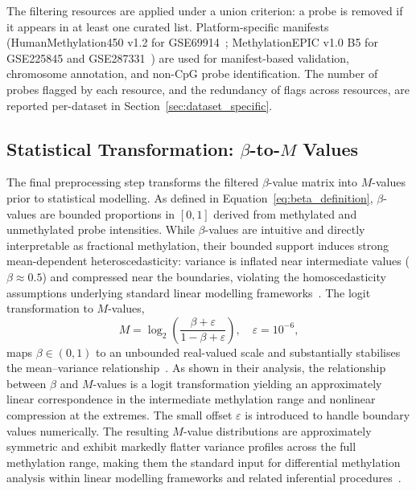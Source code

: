 The filtering resources are applied under a union criterion: a probe is removed if it appears in at least one curated list. Platform-specific 
manifests (HumanMethylation450 v1.2 for GSE69914~\cite{Illumina450kAnno}; 
MethylationEPIC v1.0 B5 for GSE225845 and GSE287331~\cite{IlluminaEPIC}) 
are used for manifest-based validation, chromosome annotation, and 
non-CpG probe identification. The number of probes flagged by each 
resource, and the redundancy of flags across resources, are reported 
per-dataset in Section~\ref{sec:dataset_specific}.

\subsection{Statistical Transformation: $\beta$-to-$M$ Values}
\label{subsec:step3}

The final preprocessing step transforms the filtered $\beta$-value matrix 
into $M$-values prior to statistical modelling. As defined in Equation~\eqref{eq:beta_definition}, $\beta$-values are bounded proportions in $[0,1]$ derived from methylated and unmethylated probe intensities. While $\beta$-values are intuitive and directly 
interpretable as fractional methylation, their bounded support induces 
strong mean-dependent heteroscedasticity: variance is inflated near 
intermediate values ($\beta \approx 0.5$) and compressed near the 
boundaries, violating the homoscedasticity assumptions underlying 
standard linear modelling frameworks~\cite{Du2010}. The logit transformation to $M$-values,
\begin{equation}
    M = \log_2\!\left(\frac{\beta + \varepsilon}{1 - \beta + \varepsilon}\right),
    \quad \varepsilon = 10^{-6},
    \label{eq:mvalue}
\end{equation}
maps $\beta \in (0,1)$ to an unbounded real-valued scale and 
substantially stabilises the mean--variance relationship~\cite{Du2010}. 
As shown in their analysis, the relationship between $\beta$ and $M$-values 
is a logit transformation yielding an approximately linear correspondence 
in the intermediate methylation range and nonlinear compression at the 
extremes. The small offset $\varepsilon$ is introduced to handle boundary values 
numerically. The resulting $M$-value distributions are approximately 
symmetric and exhibit markedly flatter variance profiles across the full 
methylation range, making them the standard input for differential methylation analysis within linear modelling frameworks and related inferential procedures~\cite{Triche2013Noob, Fortin2017, Thienpont2016}.


